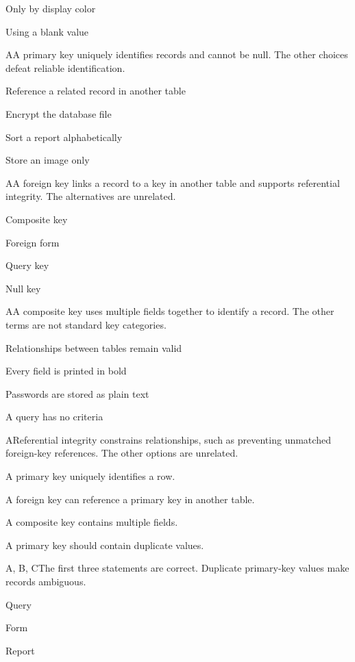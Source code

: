 \begin{enumerate}[label=\textbf{Q\arabic*.}, leftmargin=*]
{   \item Only by display color
   \item Using a blank value}
  {A}{A primary key uniquely identifies records and cannot be null. The other choices defeat reliable identification.}
  {\item Reference a related record in another table
   \item Encrypt the database file
   \item Sort a report alphabetically
   \item Store an image only}
  {A}{A foreign key links a record to a key in another table and supports referential integrity. The alternatives are unrelated.}
  {\item Composite key
   \item Foreign form
   \item Query key
   \item Null key}
  {A}{A composite key uses multiple fields together to identify a record. The other terms are not standard key categories.}
  {\item Relationships between tables remain valid
   \item Every field is printed in bold
   \item Passwords are stored as plain text
   \item A query has no criteria}
  {A}{Referential integrity constrains relationships, such as preventing unmatched foreign-key references. The other options are unrelated.}
  {\item A primary key uniquely identifies a row.
   \item A foreign key can reference a primary key in another table.
   \item A composite key contains multiple fields.
   \item A primary key should contain duplicate values.}
  {A, B, C}{The first three statements are correct. Duplicate primary-key values make records ambiguous.}
\fi
\ifnum{}
  {\item Query
   \item Form
   \item Report
}
\end{enumerate}

